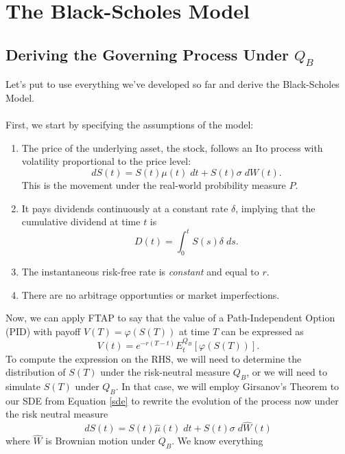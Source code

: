 \documentclass[12pt]{article}
\theoremstyle{plain}
\theoremstyle{definition}
\theoremstyle{remark}
\begin{document}
\newpage


\section{The Black-Scholes Model}

\subsection{Deriving the Governing Process Under $Q_B$}

Let's put to use everything we've developed so far and derive the 
Black-Scholes Model.
\\
\\
First, we start by specifying the assumptions of the model:
\begin{enumerate}
   \item{The price of the underlying asset, the stock, follows
      an Ito process with volatility proportional to the price
      level:
      \begin{equation}
	 \label{sde}
	 dS(t) = S(t)\mu(t) \; dt + S(t) \sigma \; dW(t).
      \end{equation}
      This is the movement under the real-world probibility measure $P$.
      }
   \item{It pays dividends continuously at a constant rate $\delta$,
      implying that the cumulative dividend at time $t$ is
	 \[ D(t) = \int^t_0 S(s) \delta \; ds .\]
      }
   \item{The instantaneous risk-free rate is \emph{constant} and 
      equal to $r$.}
   \item{There are no arbitrage opportunties or market imperfections.}
\end{enumerate}
Now, we can apply FTAP to say that the value of a Path-Independent
Option (PID) with payoff $V(T) = \varphi(S(T))$ at time $T$ can be 
expressed as
   \[ V(t) = e^{-r(T-t)}E_t^{Q_B}\left[\varphi(S(T))\right].\]
To compute the expression on the RHS, we will need to determine
the distribution of $S(T)$ under the risk-neutral measure $Q_B$, or
we will need to simulate $S(T)$ under $Q_B$.  In that case, 
we will employ Girsanov's Theorem to our SDE from Equation \ref{sde}
to rewrite the evolution of the process now under the risk neutral
measure
\begin{equation}
   \label{girs}
   dS(t) = S(t)\hat{\mu}(t) \; dt + S(t) \sigma \; d\hat{W}(t) 
\end{equation}
where $\hat{W}$ is Brownian motion under $Q_B$. We know everything
\end{document}

